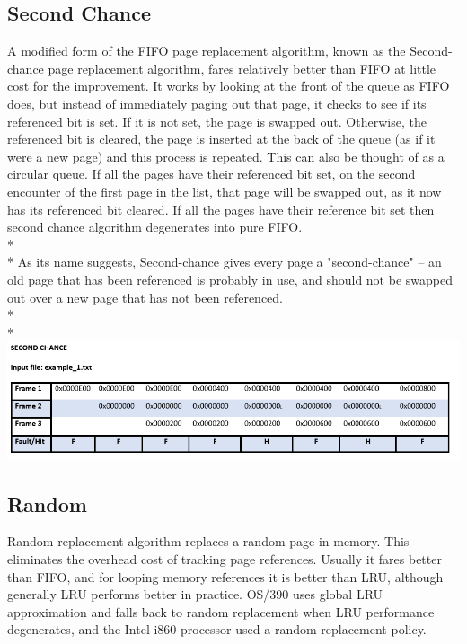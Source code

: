 \documentclass[12pt, oneside, a4paper]{report}
\begin{document}
\subsection*{Second Chance}
A modified form of the FIFO page replacement algorithm, known as the Second-chance page replacement algorithm, fares relatively better than FIFO at little cost for the improvement. It works by looking at the front of the queue as FIFO does, but instead of immediately paging out that page, it checks to see if its referenced bit is set. If it is not set, the page is swapped out. Otherwise, the referenced bit is cleared, the page is inserted at the back of the queue (as if it were a new page) and this process is repeated. This can also be thought of as a circular queue. If all the pages have their referenced bit set, on the second encounter of the first page in the list, that page will be swapped out, as it now has its referenced bit cleared. If all the pages have their reference bit set then second chance algorithm degenerates into pure FIFO.
\\*
\\*
As its name suggests, Second-chance gives every page a "second-chance" – an old page that has been referenced is probably in use, and should not be swapped out over a new page that has not been referenced.
\\*
\\*
\includegraphics[scale=0.6]{second_chance}
\newpage

\subsection*{Random}
Random replacement algorithm replaces a random page in memory. This eliminates the overhead cost of tracking page references. Usually it fares better than FIFO, and for looping memory references it is better than LRU, although generally LRU performs better in practice. OS/390 uses global LRU approximation and falls back to random replacement when LRU performance degenerates, and the Intel i860 processor used a random replacement policy.
\newpage
\end{document}

